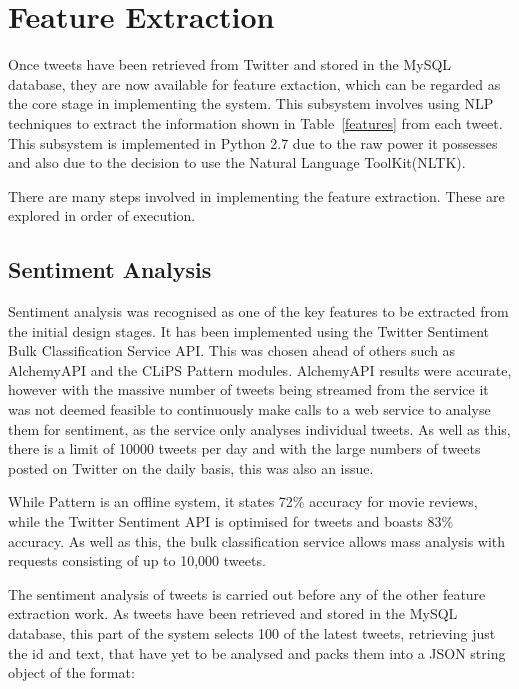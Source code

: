 
\section{Feature Extraction}
Once tweets have been retrieved from Twitter and stored in the MySQL database, they are now available for feature extaction, which can be regarded as the core stage in implementing the system. This subsystem involves using NLP techniques to extract the information shown in Table~\ref{features} from each tweet. This subsystem is implemented in Python 2.7 due to the raw power it possesses and also due to the decision to use the Natural Language ToolKit(NLTK)\cite{NLTK}.

There are many steps involved in implementing the feature extraction. These are explored in order of execution.

\subsection{Sentiment Analysis}
Sentiment analysis was recognised as one of the key features to be extracted from the initial design stages. It has been implemented using the Twitter Sentiment Bulk Classification Service API. This was chosen ahead of others such as AlchemyAPI\cite{alchemyapi} and the CLiPS Pattern modules. AlchemyAPI results were accurate, however with the massive number of tweets being streamed from the service it was not deemed feasible to continuously make calls to a web service to analyse them for sentiment, as the service only analyses individual tweets. As well as this, there is a limit of 10000 tweets per day and with the large numbers of tweets posted on Twitter on the daily basis, this was also an issue.

While Pattern is an offline system, it states 72\% accuracy for movie reviews\cite{pattern}, while the Twitter Sentiment API is optimised for tweets and boasts 83\% accuracy\cite{Go_Bhayani_Huang_2009}. As well as this, the bulk classification service allows mass analysis with requests consisting of up to 10,000 tweets.

The sentiment analysis of tweets is carried out before any of the other feature extraction work. As tweets have been retrieved and stored in the MySQL database, this part of the system selects 100 of the latest tweets, retrieving just the id and text, that have yet to be analysed and packs them into a JSON string object of the format:

